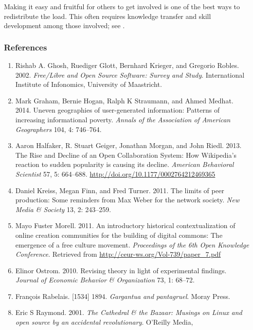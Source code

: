 Making it easy and fruitful for others to get involved is one of the
best ways to redistribute the load. This often requires knowledge
transfer and skill development among those involved; see .

\hypertarget{references}{%
\subsubsection{References}\label{references}}

\begin{enumerate}
\def\labelenumi{\arabic{enumi}.}
\item
  Rishab A. Ghosh, Ruediger Glott, Bernhard Krieger, and Gregorio
  Robles. 2002. \emph{Free/Libre and Open Source Software: Survey and
  Study}. International Institute of Infonomics, University of
  Maastricht.
\item
  Mark Graham, Bernie Hogan, Ralph K Straumann, and Ahmed Medhat. 2014.
  Uneven geographies of user-generated information: Patterns of
  increasing informational poverty. \emph{Annals of the Association of
  American Geographers} 104, 4: 746--764.
\item
  Aaron Halfaker, R. Stuart Geiger, Jonathan Morgan, and John Riedl.
  2013. The Rise and Decline of an Open Collaboration System: How
  Wikipedia's reaction to sudden popularity is causing its decline.
  \emph{American Behavioral Scientist} 57, 5: 664--688.
  \url{http://doi.org/10.1177/0002764212469365}
\item
  Daniel Kreiss, Megan Finn, and Fred Turner. 2011. The limits of peer
  production: Some reminders from Max Weber for the network society.
  \emph{New Media \& Society} 13, 2: 243--259.
\item
  Mayo Fuster Morell. 2011. An introductory historical contextualization
  of online creation communities for the building of digital commons:
  The emergence of a free culture movement. \emph{Proceedings of the 6th
  Open Knowledge Conference}. Retrieved from
  \url{http://ceur-ws.org/Vol-739/paper_7.pdf}
\item
  Elinor Ostrom. 2010. Revising theory in light of experimental
  findings. \emph{Journal of Economic Behavior \& Organization} 73, 1:
  68--72.
\item
  François Rabelais. {[}1534{]} 1894. \emph{Gargantua and pantagruel}.
  Moray Press.
\item
  Eric S Raymond. 2001. \emph{The Cathedral \& the Bazaar: Musings on
  Linux and open source by an accidental revolutionary}. O'Reilly Media,

\end{enumerate}
